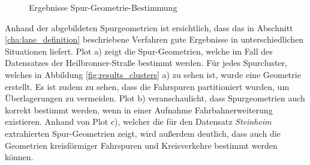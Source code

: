 \begin{figure}[H]
    \centering
    \caption{Ergebnisse Spur-Geometrie-Bestimmung}
    \label{fig:results_laneGeometries}
\end{figure}

Anhand der abgebildeten Spurgeometrien ist ersichtlich, dass das in Abschnitt \ref{cha:lane_definition}
beschriebene Verfahren gute Ergebnisse in unterschiedlichen Situationen liefert.
Plot a) zeigt die Spur-Geometrien, welche im Fall des Datensatzes der Heilbronner-Straße bestimmt werden.
Für jedes Spurcluster, welches in Abbildung \ref{fig:results_clusters} a) zu sehen ist, wurde eine Geometrie erstellt.
Es ist zudem zu sehen, dass die Fahrspuren partitioniert wurden, um Überlagerungen zu vermeiden.
Plot b) veranschaulicht, dass Spurgeometrien auch korrekt bestimmt werden, wenn in einer Aufnahme
Fahrbahnerweiterung existieren.
Anhand von Plot c), welcher die für den Datensatz \textit{Steinheim} extrahierten Spur-Geometrien zeigt, wird
außerdem deutlich, dass auch die Geometrien kreisförmiger Fahrspuren und Kreisverkehre bestimmt werden können.

